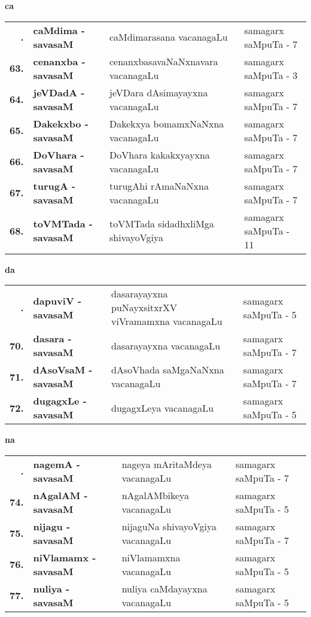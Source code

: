 \centerline{\bf ca}

{\renewcommand{\arraystretch}{1.3}
\begin{longtable}{>{\bf}r>{\bf}l>{\raggedright}p{8cm}l}
\endfirsthead
\endhead
\endfoot
\endlastfoot
62. &   caMdima - savasaM &  caMdimarasana vacanagaLu & samagarx saMpuTa - 7 \\
63. &   cenanxba - savasaM &  cenanxbasavaNaNxnavara vacanagaLu & samagarx saMpuTa - 3 \\
64. &   jeVDadA - savasaM &  jeVDara dAsimayayxna vacanagaLu & samagarx saMpuTa - 7 \\
65. &  Dakekxbo - savasaM &  Dakekxya bomamxNaNxna vacanagaLu & samagarx saMpuTa - 7 \\
66. & DoVhara - savasaM & DoVhara kakakxyayxna vacanagaLu & samagarx saMpuTa - 7 \\
67. &  turugA - savasaM &  turugAhi rAmaNaNxna vacanagaLu & samagarx saMpuTa - 7 \\
68. &  toVMTada - savasaM & toVMTada sidadhxliMga shivayoVgiya & samagarx saMpuTa - 11
\end{longtable}}

\smallskip

\centerline{\bf da}

{\renewcommand{\arraystretch}{1.3}
\begin{longtable}{>{\bf}r>{\bf}l>{\raggedright}p{8cm}l}
\endfirsthead
\endhead
\endfoot
\endlastfoot
69. &  dapuviV - savasaM & dasarayayxna puNayxsitxrXV viVramamxna vacanagaLu & samagarx saMpuTa - 5\\
70. &  dasara - savasaM &  dasarayayxna vacanagaLu & samagarx saMpuTa - 7 \\
71. &  dAsoVsaM - savasaM & dAsoVhada saMgaNaNxna vacanagaLu & samagarx saMpuTa - 7 \\
72. &  dugagxLe - savasaM & dugagxLeya vacanagaLu & samagarx saMpuTa - 5
\end{longtable}}

\smallskip

\centerline{\bf na}

{\renewcommand{\arraystretch}{1.3}
\begin{longtable}{>{\bf}r>{\bf}l>{\raggedright}p{8cm}l}
\endfirsthead
\endhead
\endfoot
\endlastfoot
73. & nagemA - savasaM &  nageya mAritaMdeya vacanagaLu & samagarx saMpuTa - 7\\
74. & nAgalAM  - savasaM & nAgalAMbikeya vacanagaLu & samagarx saMpuTa - 5 \\
75. & nijagu  - savasaM & nijaguNa shivayoVgiya vacanagaLu & samagarx saMpuTa - 7 \\
76. & niVlamamx  - savasaM & niVlamamxna vacanagaLu & samagarx saMpuTa - 5 \\
77. & nuliya  - savasaM & nuliya caMdayayxna vacanagaLu & samagarx saMpuTa - 5
\end{longtable}}
\smallskip

